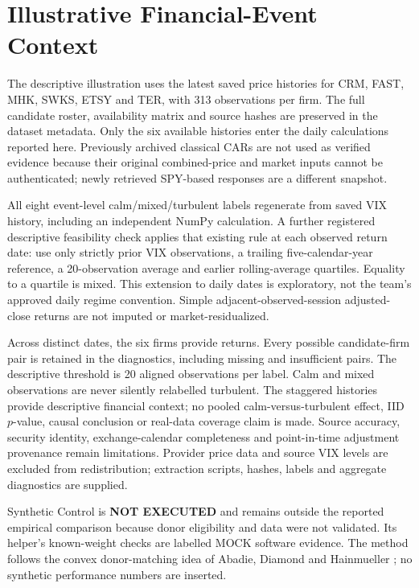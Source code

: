 \documentclass[conference]{IEEEtran}
\begin{document}
\section{Illustrative Financial-Event Context}
The descriptive illustration uses the latest saved price histories for CRM, FAST, MHK, SWKS, ETSY and TER, with 313 observations per firm. The full candidate roster, availability matrix and source hashes are preserved in the dataset metadata. Only the six available histories enter the daily calculations reported here. Previously archived classical CARs are not used as verified evidence because their original combined-price and market inputs cannot be authenticated; newly retrieved SPY-based responses are a different snapshot.

All eight event-level calm/mixed/turbulent labels regenerate from saved VIX history, including an independent NumPy calculation. A further registered descriptive feasibility check applies that existing rule at each observed return date: use only strictly prior VIX observations, a trailing five-calendar-year reference, a 20-observation average and earlier rolling-average quartiles. Equality to a quartile is mixed. This extension to daily dates is exploratory, not the team's approved daily regime convention. Simple adjacent-observed-session adjusted-close returns are not imputed or market-residualized.

Across \LabelDates{} distinct dates, the six firms provide \ReturnRows{} returns. Every possible candidate-firm pair is retained in the diagnostics, including missing and insufficient pairs. The descriptive threshold is 20 aligned observations per label. \DailySummary{} Calm and mixed observations are never silently relabelled turbulent. The staggered histories provide descriptive financial context; no pooled calm-versus-turbulent effect, IID $p$-value, causal conclusion or real-data coverage claim is made. Source accuracy, security identity, exchange-calendar completeness and point-in-time adjustment provenance remain limitations. Provider price data and source VIX levels are excluded from redistribution; extraction scripts, hashes, labels and aggregate diagnostics are supplied.

Synthetic Control is \textbf{NOT EXECUTED} and remains outside the reported empirical comparison because donor eligibility and data were not validated. Its helper's known-weight checks are labelled MOCK software evidence. The method follows the convex donor-matching idea of Abadie, Diamond and Hainmueller \cite{scm}; no synthetic performance numbers are inserted.
\end{document}
